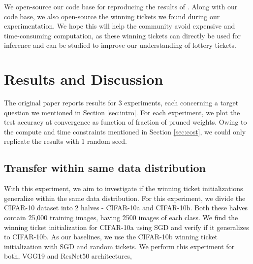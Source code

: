     We open-source our code base for reproducing the results of \cite{repro_paper}. Along with our code base, we also open-source the winning tickets we found during our experimentation. We hope this will help the community avoid expensive and time-consuming computation, as these winning tickets can directly be used for inference and can be studied to improve our understanding of lottery tickets. 
    
    \section{Results and Discussion}
    \label{sec:results}
    The original paper reports results for 3 experiments, each concerning a target question we mentioned in Section \ref{sec:intro}. For each experiment, we plot the test accuracy at convergence as function of fraction of pruned weights. Owing to the compute and time constraints mentioned in Section \ref{sec:cost}, we could only replicate the results with 1 random seed. 
    
    \subsection{Transfer within same data distribution}
    With this experiment, we aim to investigate if the winning ticket initializations generalize within the same data distribution. For this experiment, we divide the CIFAR-10 dataset into 2 halves - CIFAR-10a and CIFAR-10b. Both these halves contain 25,000 training images, having 2500 images of each class. We find the winning ticket initialization for CIFAR-10a using SGD and verify if it generalizes to CIFAR-10b. As our baselines, we use the CIFAR-10b winning ticket initialization with SGD and random tickets. We perform this experiment for both, VGG19 and ResNet50 architectures,
    
